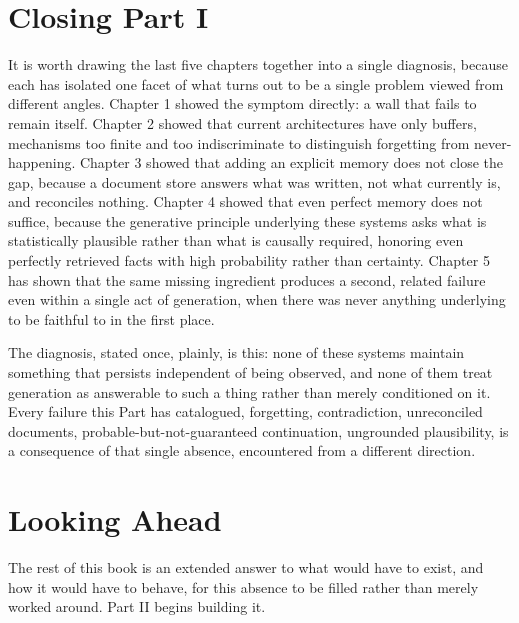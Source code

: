 \section{Closing Part I}

It is worth drawing the last five chapters together into a single diagnosis, because each has isolated one facet of what turns out to be a single problem viewed from different angles. Chapter 1 showed the symptom directly: a wall that fails to remain itself. Chapter 2 showed that current architectures have only buffers, mechanisms too finite and too indiscriminate to distinguish forgetting from never-happening. Chapter 3 showed that adding an explicit memory does not close the gap, because a document store answers what was written, not what currently is, and reconciles nothing. Chapter 4 showed that even perfect memory does not suffice, because the generative principle underlying these systems asks what is statistically plausible rather than what is causally required, honoring even perfectly retrieved facts with high probability rather than certainty. Chapter 5 has shown that the same missing ingredient produces a second, related failure even within a single act of generation, when there was never anything underlying to be faithful to in the first place.

The diagnosis, stated once, plainly, is this: none of these systems maintain something that persists independent of being observed, and none of them treat generation as answerable to such a thing rather than merely conditioned on it. Every failure this Part has catalogued, forgetting, contradiction, unreconciled documents, probable-but-not-guaranteed continuation, ungrounded plausibility, is a consequence of that single absence, encountered from a different direction.

\section{Looking Ahead}

The rest of this book is an extended answer to what would have to exist, and how it would have to behave, for this absence to be filled rather than merely worked around. Part II begins building it.
